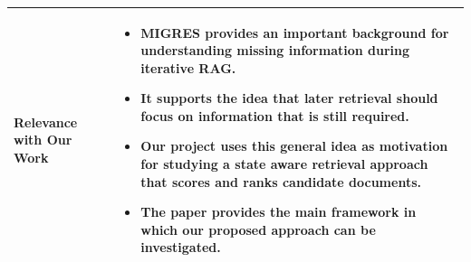 \documentclass[12pt,a4paper]{report}
\begin{document}
\begin{longtable}{|p{1.25in}|p{5.15in}|}
\textbf{Relevance with Our Work} &
\begin{itemize}[leftmargin=0.18in,itemsep=0.05in,topsep=0pt,parsep=0pt]
\item MIGRES provides an important background for understanding missing information during iterative RAG.
\item It supports the idea that later retrieval should focus on information that is still required.
\item Our project uses this general idea as motivation for studying a state aware retrieval approach that scores and ranks candidate documents.
\item The paper provides the main framework in which our proposed approach can be investigated.
\end{itemize} \\ \hline
\end{longtable}
\clearpage
\end{document}

